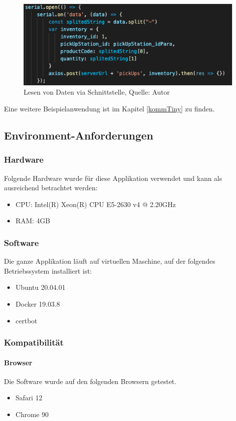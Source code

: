 \begin{figure}[H]
	\centering
	\includegraphics[scale=0.5]{images/readDataUart.png}
	\caption[Lesen von Daten via Schnittstelle]{Lesen von Daten via Schnittstelle, Quelle: Autor}
	\label{img: read}
\end{figure}

Eine weitere Beispielanwendung ist im Kapitel \ref{kommTiny} zu finden. 
\subsection{Environment-Anforderungen}\label{environmentanforderungen}
\subsubsection{Hardware}
Folgende Hardware wurde für diese Applikation verwendet und kann als ausreichend betrachtet werden:
\begin{itemize}
	\item CPU: Intel(R) Xeon(R) CPU E5-2630 v4 @ 2.20GHz
	\item RAM: 4GB
\end{itemize}
\subsubsection{Software}
Die ganze Applikation läuft auf virtuellen Maschine, auf der folgendes Betriebssystem installiert ist:
\begin{itemize}
	\item Ubuntu 20.04.01
	\item Docker 19.03.8
	\item certbot
\end{itemize}
\subsubsection{Kompatibilität}
\paragraph{Browser}
Die Software wurde auf den folgenden Browsern getestet. 
\begin{itemize}
	\item Safari 12
	\item Chrome 90
\end{itemize}
\newpage